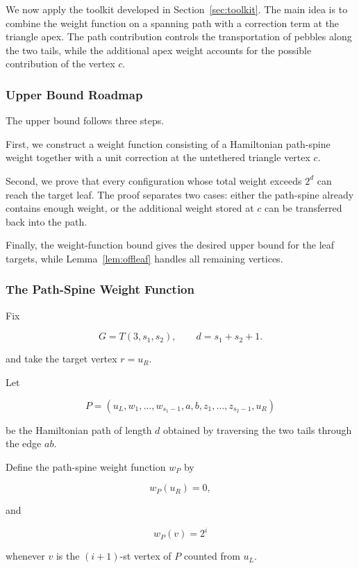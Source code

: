 

We now apply the toolkit developed in Section~\ref{sec:toolkit}.
The main idea is to combine the weight function on a spanning path with
a correction term at the triangle apex. The path contribution controls
the transportation of pebbles along the two tails, while the additional
apex weight accounts for the possible contribution of the vertex $c$.



\subsubsection{Upper Bound Roadmap}


The upper bound follows three steps.

First, we construct a weight function consisting of a Hamiltonian
path-spine weight together with a unit correction at the untethered
triangle vertex $c$.

Second, we prove that every configuration whose total weight exceeds
$2^d$ can reach the target leaf. The proof separates two cases:
either the path-spine already contains enough weight, or the additional
weight stored at $c$ can be transferred back into the path.

Finally, the weight-function bound gives the desired upper bound for
the leaf targets, while Lemma~\ref{lem:offleaf} handles all remaining
vertices.



\subsubsection{The Path-Spine Weight Function}
\label{sec:path-spine-wf}


Fix

\[
G=T(3,s_1,s_2),\qquad d=s_1+s_2+1 .
\]

and take the target vertex $r=u_R$.

Let

\[
P=(u_L,w_1,\ldots,w_{s_1-1},a,b,z_1,\ldots,z_{s_2-1},u_R)
\]

be the Hamiltonian path of length $d$ obtained by traversing the two
tails through the edge $ab$.


Define the path-spine weight function $w_P$ by

\[
w_P(u_R)=0,
\]

and

\[
w_P(v)=2^i
\]

whenever $v$ is the $(i+1)$-st vertex of $P$ counted from $u_L$.

